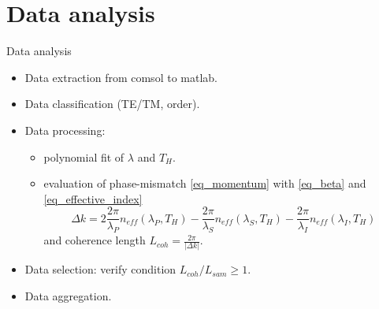 \documentclass[11pt, leqno]{beamer}
\begin{document}
\section{Data analysis}
\begin{frame}{Data analysis}
	\begin{itemize}
	\item	Data extraction from comsol to matlab.
	\item	Data classification (TE/TM, order).
	\item	Data processing:\\
			\begin{itemize}
			\item	polynomial fit of $\lambda$ and $T_H$.
			\item	evaluation of phase-mismatch \eqref{eq_momentum} with \eqref{eq_beta} and \eqref{eq_effective_index}
					\begin{equation}
					\Delta k = 2	 \frac{2\pi}{ \lambda_P } n_{eff}(\lambda_P,T_H)
								-\frac{2\pi}{ \lambda_S } n_{eff}(\lambda_S,T_H)
								-\frac{2\pi}{ \lambda_I } n_{eff}(\lambda_I,T_H)
					\end{equation}
					and coherence length $L_{coh} = \frac{2\pi}{|\Delta k|}$.
			\end{itemize}
	\item	Data selection: verify condition $L_{coh}/L_{sam} \geq 1$.
	\item	Data aggregation.
	\end{itemize}
\end{frame}
\end{document}

